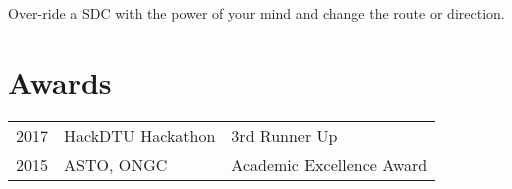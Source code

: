 \documentclass[]{deedy-resume-openfont}
\begin{document}
\begin{minipage}[t]{0.66\textwidth}
Over-ride a SDC with the power of your mind and change the route or direction.
\sectionsep


\section{Awards} 
\begin{tabular}{rll}
2017 & HackDTU Hackathon  & 3rd Runner Up \\
2015 & ASTO, ONGC  & Academic Excellence Award\\
\end{tabular}
\sectionsep



\end{minipage}
\end{document}
